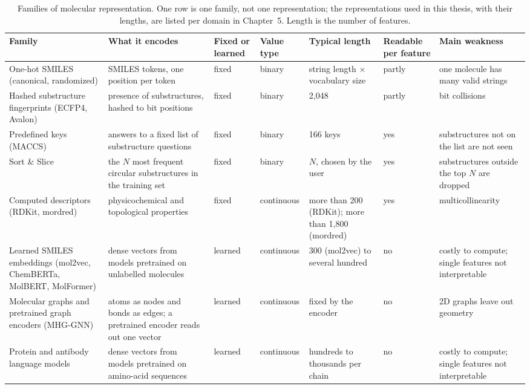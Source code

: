 \begin{table}[h]
\centering
\footnotesize
\setlength{\tabcolsep}{3pt}
\caption{Families of molecular representation. One row is one family, not one representation; the representations used in this thesis, with their lengths, are listed per domain in Chapter~5. Length is the number of features.}
\label{tab:rep_families}
\begin{tabular}{p{2.4cm}p{2.6cm}p{1.1cm}p{1.2cm}p{1.9cm}p{1.1cm}p{2.6cm}}
\toprule
Family & What it encodes & Fixed or learned & Value type & Typical length & Readable per feature & Main weakness \\
\midrule
One-hot SMILES (canonical, randomized) & SMILES tokens, one position per token & fixed & binary & string length $\times$ vocabulary size & partly & one molecule has many valid strings \\
Hashed substructure fingerprints (ECFP4, Avalon) & presence of substructures, hashed to bit positions & fixed & binary & 2,048 & partly & bit collisions \\
Predefined keys (MACCS) & answers to a fixed list of substructure questions & fixed & binary & 166 keys & yes & substructures not on the list are not seen \\
Sort \& Slice & the $N$ most frequent circular substructures in the training set & fixed & binary & $N$, chosen by the user & yes & substructures outside the top $N$ are dropped \\
Computed descriptors (RDKit, mordred) & physicochemical and topological properties & fixed & continuous & more than 200 (RDKit); more than 1,800 (mordred) & yes & multicollinearity \\
Learned SMILES embeddings (mol2vec, ChemBERTa, MolBERT, MolFormer) & dense vectors from models pretrained on unlabelled molecules & learned & continuous & 300 (mol2vec) to several hundred & no & costly to compute; single features not interpretable \\
Molecular graphs and pretrained graph encoders (MHG-GNN) & atoms as nodes and bonds as edges; a pretrained encoder reads out one vector & learned & continuous & fixed by the encoder & no & 2D graphs leave out geometry \\
Protein and antibody language models & dense vectors from models pretrained on amino-acid sequences & learned & continuous & hundreds to thousands per chain & no & costly to compute; single features not interpretable \\
\bottomrule
\end{tabular}
\end{table}

